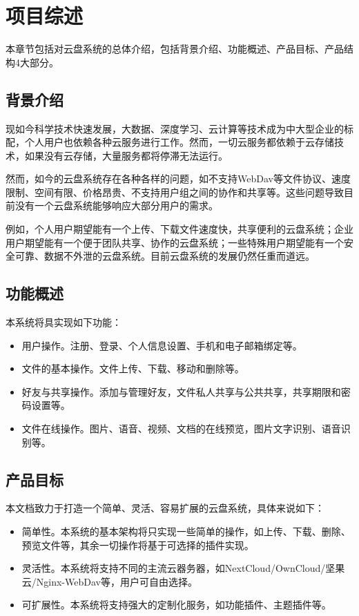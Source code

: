 \section{项目综述}

本章节包括对云盘系统的总体介绍，包括背景介绍、功能概述、产品目标、产品结构4大部分。

\subsection{背景介绍}

现如今科学技术快速发展，大数据、深度学习、云计算等技术成为中大型企业的标配，个人用户也依赖各种云服务进行工作。然而，一切云服务都依赖于云存储技术，如果没有云存储，大量服务都将停滞无法运行。

然而，如今的云盘系统存在各种各样的问题，如不支持WebDav等文件协议、速度限制、空间有限、价格昂贵、不支持用户组之间的协作和共享等。这些问题导致目前没有一个云盘系统能够响应大部分用户的需求。

例如，个人用户期望能有一个上传、下载文件速度快，共享便利的云盘系统；企业用户期望能有一个便于团队共享、协作的云盘系统；一些特殊用户期望能有一个安全可靠、数据不外泄的云盘系统。目前云盘系统的发展仍然任重而道远。

\subsection{功能概述}

本系统将具实现如下功能：
\begin{itemize}
    \item 用户操作。注册、登录、个人信息设置、手机和电子邮箱绑定等。
    \item 文件的基本操作。文件上传、下载、移动和删除等。
    \item 好友与共享操作。添加与管理好友，文件私人共享与公共共享，共享期限和密码设置等。
    \item 文件在线操作。图片、语音、视频、文档的在线预览，图片文字识别、语音识别等。
\end{itemize}

\subsection{产品目标}

本文档致力于打造一个简单、灵活、容易扩展的云盘系统，具体来说如下：
\begin{itemize}
    \item 简单性。本系统的基本架构将只实现一些简单的操作，如上传、下载、删除、预览文件等，其余一切操作将基于可选择的插件实现。
    \item 灵活性。本系统将支持不同的主流云器务器，如NextCloud/OwnCloud/坚果云/Nginx-WebDav等，用户可自由选择。
    \item 可扩展性。本系统将支持强大的定制化服务，如功能插件、主题插件等。
\end{itemize}

